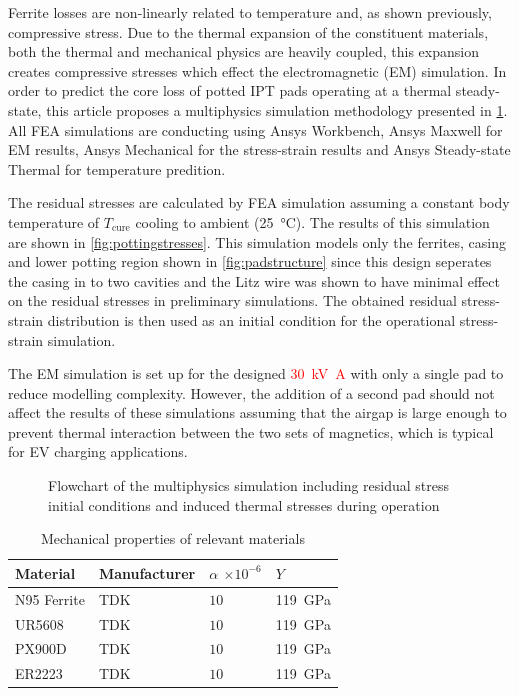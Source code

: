 \documentclass[conference]{IEEEtran}
\begin{document}
Ferrite losses are non-linearly related to temperature and, as shown previously, compressive stress. 
Due to the thermal expansion of the constituent materials, both the thermal and mechanical physics are heavily coupled, this expansion creates compressive stresses which effect the electromagnetic (EM) simulation. 
In order to predict the core loss of potted IPT pads operating at a thermal steady-state, this article proposes a multiphysics simulation methodology presented in \cref{fig:simulationflowchart}. 
All FEA simulations are conducting using Ansys Workbench, Ansys Maxwell for EM results, Ansys Mechanical for the stress-strain results and Ansys Steady-state Thermal for temperature predition. 

The residual stresses are calculated by FEA simulation assuming a constant body temperature of $T_\text{cure}$ cooling to ambient (\SI{25}{\celsius}). 
The results of this simulation are shown in \cref{fig:pottingstresses}. 
This simulation models only the ferrites, casing and lower potting region shown in \cref{fig:padstructure} since this design seperates the casing in to two cavities and the Litz wire was shown to have minimal effect on the residual stresses in preliminary simulations. 
The obtained residual stress-strain distribution is then used as an initial condition for the operational stress-strain simulation. 

The EM simulation is set up for the designed \textcolor{red}{\SI{30}{\kilo\volt\ampere}} with only a single pad to reduce modelling complexity. 
However, the addition of a second pad should not affect the results of these simulations assuming that the airgap is large enough to prevent thermal interaction between the two sets of magnetics, which is typical for EV charging applications.

\begin{figure}
  
  \caption{Flowchart of the multiphysics simulation including residual stress initial conditions and induced thermal stresses during operation}
  \label{fig:simulationflowchart}
\end{figure}

\begin{table}
  \centering
  \caption{Mechanical properties of relevant materials}
  \begin{tabular}{@{}llll@{}}
    \toprule
    Material & Manufacturer & $\alpha$ $\times 10^{-6}$ & $Y$ \\ \midrule
    N95 Ferrite & TDK & $10$ & \SI{119}{\giga\pascal} \\
    UR5608 & TDK & $10$ & \SI{119}{\giga\pascal} \\
    PX900D & TDK & $10$ & \SI{119}{\giga\pascal} \\
    ER2223 & TDK & $10$ & \SI{119}{\giga\pascal} \\
    \bottomrule
  \end{tabular}
\end{table}
\end{document}
